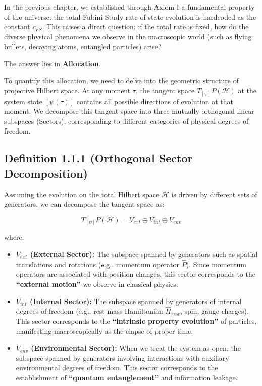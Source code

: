 \documentclass[11pt,a4paper,twoside]{book}
\begin{document}
In the previous chapter, we established through Axiom I a fundamental property of the universe: the total Fubini-Study rate of state evolution is hardcoded as the constant \textbf{$c_{FS}$}. This raises a direct question: if the total rate is fixed, how do the diverse physical phenomena we observe in the macroscopic world (such as flying bullets, decaying atoms, entangled particles) arise?

The answer lies in \textbf{Allocation}.

To quantify this allocation, we need to delve into the geometric structure of projective Hilbert space. At any moment \textbf{$\tau$}, the tangent space \textbf{$T_{[\psi]}P(\mathcal{H})$} at the system state \textbf{$[\psi(\tau)]$} contains all possible directions of evolution at that moment. We decompose this tangent space into three mutually orthogonal linear subspaces (Sectors), corresponding to different categories of physical degrees of freedom.

\subsection{Definition 1.1.1 (Orthogonal Sector Decomposition)}

Assuming the evolution on the total Hilbert space \textbf{$\mathcal{H}$} is driven by different sets of generators, we can decompose the tangent space as:

$$T_{[\psi]}P(\mathcal{H}) = V_{ext} \oplus V_{int} \oplus V_{env}$$

where:

\begin{itemize}
\item \textbf{$V_{ext}$ (External Sector):} The subspace spanned by generators such as spatial translations and rotations (e.g., momentum operator \textbf{$\hat{P}$}). Since momentum operators are associated with position changes, this sector corresponds to the \textbf{``external motion''} we observe in classical physics.

\item \textbf{$V_{int}$ (Internal Sector):} The subspace spanned by generators of internal degrees of freedom (e.g., rest mass Hamiltonian \textbf{$\hat{H}_{rest}$}, spin, gauge charges). This sector corresponds to the \textbf{``intrinsic property evolution''} of particles, manifesting macroscopically as the elapse of proper time.

\item \textbf{$V_{env}$ (Environmental Sector):} When we treat the system as open, the subspace spanned by generators involving interactions with auxiliary environmental degrees of freedom. This sector corresponds to the establishment of \textbf{``quantum entanglement''} and information leakage.
\end{itemize}
\end{document}
